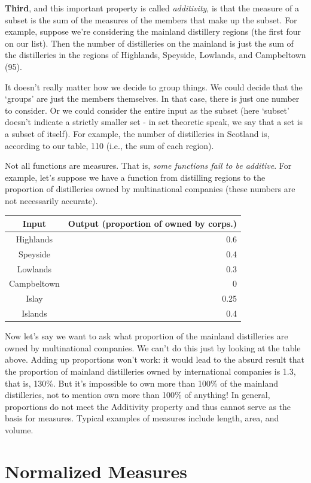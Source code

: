 \documentclass[]{tufte-book}
\begin{document}
\textbf{Third}, and this important property is called \emph{additivity}, is that the measure of a subset is the sum of the measures of the members that make up the subset. For example, suppose we're considering the mainland distillery regions (the first four on our list). Then the number of distilleries on the mainland is just the sum of the distilleries in the regions of Highlands, Speyside, Lowlands, and Campbeltown (95).

It doesn't really matter how we decide to group things. We could decide that the `groups' are just the members themselves. In that case, there is just one number to consider. Or we could consider the entire input as the subset (here `subset' doesn't indicate a strictly smaller set - in set theoretic speak, we say that a set is a subset of itself). For example, the number of distilleries in Scotland is, according to our table, 110 (i.e., the sum of each region).

Not all functions are measures. That is, \emph{some functions fail to be additive}. For example, let's suppose we have a function from distilling regions to the proportion of distilleries owned by multinational companies (these numbers are not necessarily accurate).

\begin{longtable}[]{@{}cr@{}}
\toprule
Input & Output (proportion of owned by corps.)\tabularnewline
\midrule
\endhead
Highlands & 0.6\tabularnewline
Speyside & 0.4\tabularnewline
Lowlands & 0.3\tabularnewline
Campbeltown & 0\tabularnewline
Islay & 0.25\tabularnewline
Islands & 0.4\tabularnewline
\bottomrule
\end{longtable}

Now let's say we want to ask what proportion of the mainland distilleries are owned by multinational companies. We can't do this just by looking at the table above. Adding up proportions won't work: it would lead to the absurd result that the proportion of mainland distilleries owned by international companies is 1.3, that is, 130\%. But it's impossible to own more than 100\% of the mainland distilleries, not to mention own more than 100\% of anything! In general, proportions do not meet the Additivity property and thus cannot serve as the basis for measures. Typical examples of measures include length, area, and volume.

\hypertarget{normalized-measures}{%
\section{Normalized Measures}\label{normalized-measures}}
\end{document}
